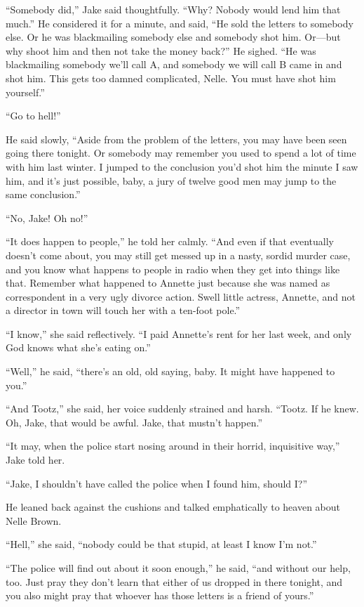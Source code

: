 \documentclass{novel}
\begin{document}
“Somebody did,” Jake said thoughtfully. “Why? Nobody would lend him that much.” He considered it for a minute, and said, “He sold the letters to somebody else. Or he was blackmailing somebody else and somebody shot him. Or—but why shoot him and then not take the money back?” He sighed. “He was blackmailing somebody we’ll call A, and somebody we will call B came in and shot him. This gets too damned complicated, Nelle. You must have shot him yourself.”

“Go to hell!”

He said slowly, “Aside from the problem of the letters, you may have been seen going there tonight. Or somebody may remember you used to spend a lot of time with him last winter. I jumped to the conclusion you’d shot him the minute I saw him, and it’s just possible, baby, a jury of twelve good men may jump to the same conclusion.”

“No, Jake! Oh no!”

“It does happen to people,” he told her calmly. “And even if that eventually doesn’t come about, you may still get messed up in a nasty, sordid murder case, and you know what happens to people in radio when they get into things like that. Remember what happened to Annette just because she was named as correspondent in a very ugly divorce action. Swell little actress, Annette, and not a director in town will touch her with a ten-foot pole.”

“I know,” she said reflectively. “I paid Annette’s rent for her last week, and only God knows what she’s eating on.”

“Well,” he said, “there’s an old, old saying, baby. It might have happened to you.”

“And Tootz,” she said, her voice suddenly strained and harsh. “Tootz. If he knew. Oh, Jake, that would be awful. Jake, that mustn’t happen.”

“It may, when the police start nosing around in their horrid, inquisitive way,” Jake told her.

“Jake, I shouldn’t have called the police when I found him, should I?”

He leaned back against the cushions and talked emphatically to heaven about Nelle Brown.

“Hell,” she said, “nobody could be that stupid, at least I know I’m not.”

“The police will find out about it soon enough,” he said, “and without our help, too. Just pray they don’t learn that either of us dropped in there tonight, and you also might pray that whoever has those letters is a friend of yours.”
\end{document}
